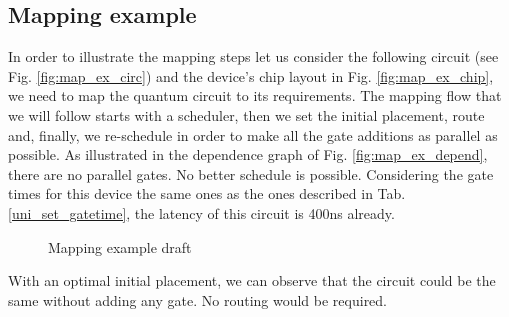 \subsection*{Mapping example}
\label{sec:org0e15a89}
In order to illustrate the mapping steps let us consider the following circuit (see Fig. \ref{fig:map_ex_circ}) and the device's chip layout in Fig. \ref{fig:map_ex_chip}, we need to map the quantum circuit to its requirements.
The mapping flow that we will follow starts with a scheduler, then we set the initial placement, route and, finally, we re-schedule in order to make all the gate additions as parallel as possible.
As illustrated in the dependence graph of Fig. \ref{fig:map_ex_depend}, there are no parallel gates.
No better schedule is possible.
Considering the gate times for this device the same ones as the ones described in Tab. \ref{uni_set_gatetime}, the latency of this circuit is 400ns already.


\begin{figure}[H]
\centering
{}
\label{fig:map_ex_circ}

\label{fig:map_ex_depend}

\label{fig:map_ex_chip}

\label{fig:map_ex_def}
\caption{Mapping example draft}
\end{figure}
With an optimal initial placement, we can observe that the circuit could be the same without adding any gate.
No routing would be required.


